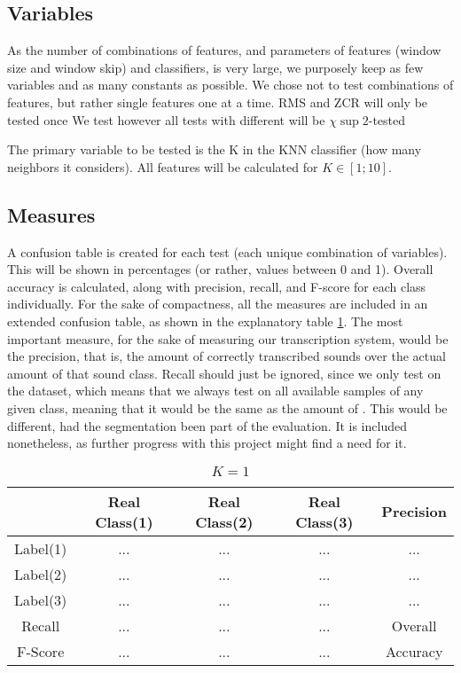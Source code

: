 	\subsection{Variables}
		As the number of combinations of features, and parameters of features (window size and window skip) and classifiers, is very large, we purposely keep as few variables and as many constants as possible.  We chose not to test combinations of features, but rather single features one at a time. RMS and ZCR will only be tested once
	 We test however all tests with different will be $\chi\sup{2}$-tested
		
		The primary variable to be tested is the K in the KNN classifier (how many neighbors it considers).
		All features will be calculated for $K \in [1;10]$.


	\subsection{Measures}
		A confusion table is created for each test (each unique combination of variables). This will be shown in percentages (or rather, values between 0 and 1). Overall accuracy is calculated, along with precision, recall, and F-score for each class individually. For the sake of compactness, all the measures are included in an extended confusion table, as shown in the explanatory table \ref{table:eval:explanatory}. 
		The most important measure, for the sake of measuring our transcription system, would be the precision, that is, the amount of correctly transcribed sounds over the actual amount of that sound class.
		Recall should just be ignored, since we only test on the dataset, which means that we always test on all available samples of any given class, meaning that it would be the same as the amount of . This would be different, had the segmentation been part of the evaluation. It is included nonetheless, as further progress with this project might find a need for it.

			\begin{table}
				\centering
				\begin{tabular}{|c | c | c | c | c |}
					\hline
					 & Real Class(1) & Real Class(2) & Real Class(3) & Precision\\ \hline
					Label(1)  & ... & ... & ... & ...\\ \hline
					Label(2)  & ... & ... & ... & ...\\ \hline
					Label(3) & ... & ... & ... & ...\\ \hline
					Recall   & ... & ... & ... & \multicolumn{1}{c}{Overall}\\ \cline{1-4}
					F-Score & ... & ... & ... & \multicolumn{1}{c}{Accuracy} \\ \cline{1-4}
				\end{tabular}
				\caption{$K=1$}
				\label{table:eval:explanatory}
			\end{table}
			
